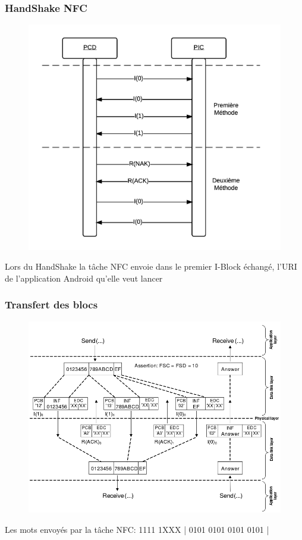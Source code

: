 \documentclass{beamer}
\begin{document}
\begin{frame}
\frametitle{HandShake NFC}
\begin{figure}
\centering
\includegraphics[scale=0.5]{images/presencecheck.png}
\end{figure}

Lors du HandShake la tâche NFC envoie dans le premier I-Block échangé, l'URI de l'application Android qu'elle veut lancer
\end{frame}

\begin{frame}
\frametitle{Transfert des blocs}
\begin{figure}
\centering
\includegraphics[scale=0.25]{images/chaining.png}
\end{figure}
Les mots envoyés par la tâche NFC: 1111 1XXX | 0101 0101 0101 0101 |
\end{frame}
\end{document}
